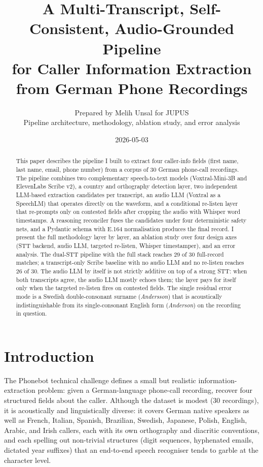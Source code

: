 \documentclass[11pt,a4paper]{article}
\title{\bfseries A Multi-Transcript, Self-Consistent, Audio-Grounded Pipeline\\
       for Caller Information Extraction from German Phone Recordings}
\author{Prepared by Melih Unsal for JUPUS\\
        \small Pipeline architecture, methodology, ablation study, and error analysis}
\date{2026-05-03}
\begin{document}
\maketitle

\begin{abstract}
This paper describes the pipeline I built to extract four caller-info
fields (first name, last name, email, phone number) from a corpus of
30 German phone-call recordings. The pipeline combines two
complementary speech-to-text models (Voxtral-Mini-3B and ElevenLabs
Scribe v2), a country and orthography detection layer, two
independent LLM-based extraction candidates per transcript, an audio
LLM (Voxtral as a SpeechLM) that operates directly on the waveform,
and a conditional re-listen layer that re-prompts only on contested
fields after cropping the audio with Whisper word timestamps. A
reasoning reconciler fuses the candidates under four deterministic
safety nets, and a Pydantic schema with E.164 normalisation produces
the final record. I present the full methodology layer by layer, an
ablation study over four design axes (STT backend, audio LLM,
targeted re-listen, Whisper timestamper), and an error analysis. The
dual-STT pipeline with the full stack reaches 29 of 30 full-record
matches; a transcript-only Scribe baseline with no audio LLM and no
re-listen reaches 26 of 30. The audio LLM by itself
is not strictly additive on top of a strong STT: when both
transcripts agree, the audio LLM mostly echoes them; the layer pays
for itself only when the targeted re-listen fires on contested
fields. The single residual error mode is a Swedish double-consonant
surname (\textit{Andersson}) that is acoustically indistinguishable
from its single-consonant English form (\textit{Anderson}) on the
recording in question.
\end{abstract}

\section{Introduction}

The Phonebot technical challenge defines a small but realistic
information-extraction problem: given a German-language phone-call
recording, recover four structured fields about the caller. Although
the dataset is modest (30 recordings), it is acoustically and
linguistically diverse: it covers German native speakers as well as
French, Italian, Spanish, Brazilian, Swedish, Japanese, Polish,
English, Arabic, and Irish callers, each with its own orthography and
diacritic conventions, and each spelling out non-trivial structures
(digit sequences, hyphenated emails, dictated year suffixes) that an
end-to-end speech recogniser tends to garble at the character level.
\end{document}
